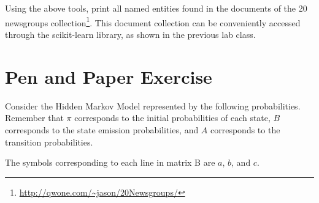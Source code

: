 \documentclass[12pt]{article}
\begin{document}
\section{}

Using the above tools, print all named entities found in the documents of the 20 newsgroups collection\footnote{ \url{http://qwone.com/~jason/20Newsgroups/}}. This document collection can be conveniently accessed through the scikit-learn library, as shown in the previous lab class.






\section{Pen and Paper Exercise}

Consider the Hidden Markov Model represented by the following probabilities. Remember that $\pi$ corresponds to the initial probabilities of each state, $B$ corresponds to the state emission probabilities, and $A$ corresponds to the transition probabilities. 

The symbols corresponding to each line in matrix B are $a$, $b$, and $c$.
\end{document}
